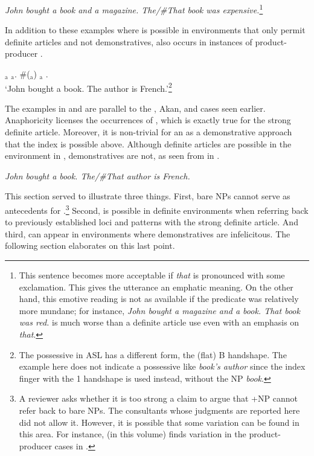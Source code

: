 \documentclass[output=paper,
modfonts
]{langscibook}
\begin{document}
\begin{exe}
\ex\label{ex:irani:22} \textit{John bought a book and a magazine. The\textnormal{/}\textnormal{\#}That book was expensive.}\footnote{This sentence becomes more acceptable if \textit{that} is pronounced with some exclamation. This gives the utterance an emphatic meaning. On the other hand, this emotive reading is not as available if the predicate was relatively more mundane; for instance, \textit{John bought a magazine and a book. That book was red.} is much worse than a definite article use even with an emphasis on \textit{that}.}
\end{exe} 

In addition to these examples where  is possible in environments that only permit definite articles and not demonstratives,  also occurs in instances of product-producer . 

\begin{exe}
\ex \label{ex:irani:23} $_\text{a}$ $_\text{a}$. \#($_\text{a}$) $_\text{a}$ .\\
`John bought a book. The author is French.'\footnote{The possessive in ASL has a different form, the (flat) B handshape. The example here does not indicate a possessive like \textit{book's author} since the index finger with the 1 handshape is used instead, without the NP \textit{book}.}
\end{exe}

The examples in  and  are parallel to the , Akan, and  cases seen earlier. Anaphoricity licenses the occurrences of , which is exactly true for the strong definite article. Moreover, it is non-trivial for an  as a demonstrative approach that the index is possible above. Although definite articles are possible in the environment in , demonstratives are not, as seen from  in . 

\begin{exe}
\ex \label{ex:irani:24} \textit{John bought a book. The\textnormal{/}\textnormal{\#}That author is French.} 
\end{exe}

This section served to illustrate three things. First, bare NPs cannot serve as antecedents for .\footnote{A reviewer asks whether it is too strong a claim to argue that +NP cannot refer back to bare NPs. The consultants whose judgments are reported here did not allow it. However, it is possible that some variation can be found in this area. For instance, \citet{SereikaiteToAppear} (in this volume) finds variation in the product-producer  cases in .} Second,  is possible in definite environments when referring back to previously established loci and patterns with the strong definite article. And third,  can appear in environments where demonstratives are infelicitous. The following section elaborates on this last point. 
\end{document}
